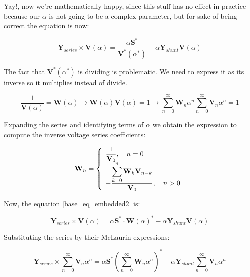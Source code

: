 \documentclass[a4paper,twoside,fleqn]{tufte-book}
\begin{document}
	Yay!, now we're mathematically happy, since this stuff has no effect in practice because our $\alpha$ is not going to be a complex parameter, but for sake of being correct the equation is now:
	
	\begin{equation}
	{\textbf{Y}_{series}\times \textbf{V}( \alpha )} = \frac{ \alpha\textbf{S}^*}{\textbf{V}^*( \alpha^* )} - \alpha \textbf{Y}_{shunt} \textbf{V}( \alpha )
	\label{base_eq_embedded2}
	\end{equation}
	



The fact that $\textbf{V}^*( \alpha^* )$ is dividing is problematic. We need to express it as its inverse so it multiplies instead of divide.

\begin{equation} 
\frac{1}{\textbf{V}( \alpha)} = \textbf{W}( \alpha ) \longrightarrow \textbf{W}( \alpha ) \textbf{V}( \alpha) = 1 \longrightarrow \sum_{n=0}^{\infty}{\textbf{W}_n \alpha^n}  \sum_{n=0}^{\infty}{\textbf{V}_n \alpha^n} = 1
\end{equation}

Expanding the series and identifying terms of $\alpha$ we obtain the expression to compute the inverse voltage series coefficients:

\begin{equation}
\textbf{W}_n =
\left\{
\begin{array}{ll}
\mathlarger{\frac{1}{\textbf{V}_0}}, \quad n=0\\
\mathlarger{-\frac{\mathlarger{\sum_{k=0}^{n}\textbf{W}_k \textbf{V}_{n-k}}}{\textbf{V}_0}}, \quad n>0
\end{array}
\right.
\end{equation}


Now, the equation \ref{base_eq_embedded2} is:

\begin{equation}
{\textbf{Y}_{series}\times \textbf{V}( \alpha )} = \alpha\textbf{S}^* \cdot \textbf{W}( \alpha)^*  - \alpha \textbf{Y}_{shunt} \textbf{V}( \alpha )
\label{base_eq_embedded3}
\end{equation}

Substituting the series by their McLaurin expressions:

\begin{equation}
{\textbf{Y}_{series}\times \sum_{n=0}^{\infty}{\textbf{V}_n \alpha^n}} = \alpha\textbf{S}^* \left(\sum_{n=0}^{\infty}{\textbf{W}_n \alpha^n}\right)^*  - \alpha \textbf{Y}_{shunt} \sum_{n=0}^{\infty}{\textbf{V}_n \alpha^n}
\label{base_eq_embedded4}
\end{equation}
\end{document}
